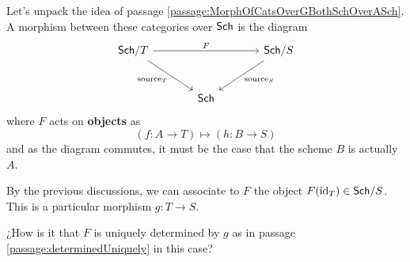 \documentclass[12pt]{memoir}
\newcounter{passage}
\begin{document}
\begin{ptcb}
    Let's unpack the idea of passage \ref{passage:MorphOfCatsOverGBothSchOverASch}. A morphism between these categories over \(\mathsf{Sch}\) is the diagram
    \[
        \begin{tikzcd}[column sep=large, row sep=large]
        \Sch/T
            \arrow[rr, "F"]
            \arrow[dr, "\text{source}_T"']&
        & \Sch/S \arrow[dl, "\text{source}_S"] \\
        & \Sch
        \end{tikzcd}
    \]
    where \(F\) acts on \textbf{objects} as
    \[
        (f:A\to T)\mapsto (h:B\to S)
    \]
    and as the diagram commutes, it must be the case that the scheme \(B\) is actually \(A\).\par
    By the previous discussions, we can associate to \(F\) the object \(F(\operatorname{id}_T)\in\mathsf{Sch}/S\). This is a particular morphism \(g:T\to S\).
    
    \begin{Qn}
        ¿How is it that \(F\) is uniquely determined by \(g\) as in passage \ref{passage:determinedUniquely} in this case?
    \end{Qn}

    \tcbline


\end{ptcb}
\end{document}
